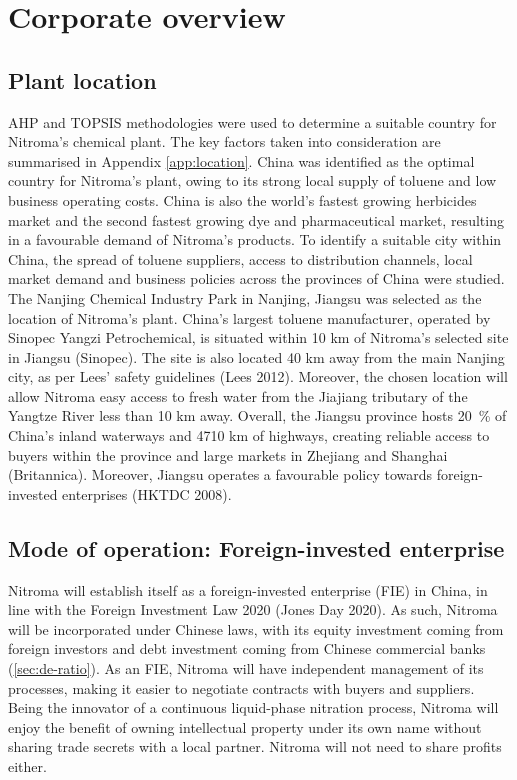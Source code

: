 \section{Corporate overview}
\subsection{Plant location}
\label{sec:location}
AHP and TOPSIS methodologies were used to determine a suitable country for Nitroma’s chemical plant. The key factors taken into consideration are summarised in Appendix \ref{app:location}. China was identified as the optimal country for Nitroma's plant, owing to its strong local supply of toluene and low business operating costs. China is also the world’s fastest growing herbicides market and the second fastest growing dye and pharmaceutical market, resulting in a favourable demand of Nitroma’s products. To identify a suitable city within China, the spread of toluene suppliers, access to distribution channels, local market demand and business policies across the provinces of China were studied. The Nanjing Chemical Industry Park in Nanjing, Jiangsu was selected as the location of Nitroma’s plant. China’s largest toluene manufacturer, operated by Sinopec Yangzi Petrochemical, is situated within 10 km of Nitroma’s selected site in Jiangsu (Sinopec). The site is also located 40 km away from the main Nanjing city, as per Lees' safety guidelines (Lees 2012). Moreover, the chosen location will allow Nitroma easy access to fresh water from the Jiajiang tributary of the Yangtze River less than 10 km away. Overall, the Jiangsu province hosts \SI{20}{\percent} of China’s inland waterways and 4710 km of highways, creating reliable access to buyers within the province and large markets in Zhejiang and Shanghai (Britannica). Moreover, Jiangsu operates a favourable policy towards foreign-invested enterprises (HKTDC 2008).

\subsection{Mode of operation: Foreign-invested enterprise}
\label{sec:mode-of-operation}
Nitroma will establish itself as a foreign-invested enterprise (FIE) in China, in line with the Foreign Investment Law 2020 (Jones Day 2020). As such, Nitroma will be incorporated under Chinese laws, with its equity investment coming from foreign investors and debt investment coming from Chinese commercial banks (\ref{sec:de-ratio}). As an FIE, Nitroma will have independent management of its processes, making it easier to negotiate contracts with buyers and suppliers. Being the innovator of a continuous liquid-phase nitration process, Nitroma will enjoy the benefit of owning intellectual property under its own name without sharing trade secrets with a local partner. Nitroma will not need to share profits either. 

